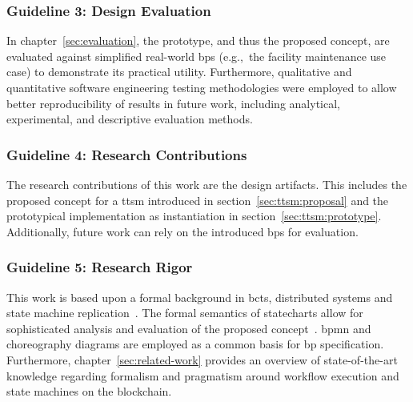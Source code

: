 \subsubsection{Guideline 3: Design Evaluation}
\label{sec:ttsm:methodology:gl3}
In chapter~\ref{sec:evaluation}, the prototype, and thus the proposed concept, are evaluated against simplified real-world \glspl{bp} (e.g.,\ the facility maintenance use case) to demonstrate its practical utility. Furthermore, qualitative and quantitative software engineering testing methodologies were employed to allow better reproducibility of results in future work, including analytical, experimental, and descriptive evaluation methods.

\subsubsection{Guideline 4: Research Contributions}
\label{sec:ttsm:methodology:gl4}
The research contributions of this work are the design artifacts. This includes the proposed concept for a \gls{ttsm} introduced in section~\ref{sec:ttsm:proposal} and the prototypical implementation as instantiation in section~\ref{sec:ttsm:prototype}. Additionally, future work can rely on the introduced \glspl{bp} for evaluation.

\subsubsection{Guideline 5: Research Rigor}
\label{sec:ttsm:methodology:gl5}
This work is based upon a formal background in \glspl{bct}, distributed systems and state machine replication~\cite{consensus_comparison_2019,nakamoto2009,ethereum_yellow_paper,impossibility_result_1985}. The formal semantics of statecharts allow for sophisticated analysis and evaluation of the proposed concept~\cite{inter_organizational_bps_managed_by_blockchain}. \gls{bpmn} and choreography diagrams are employed as a common basis for \gls{bp} specification. Furthermore, chapter~\ref{sec:related-work} provides an overview of state-of-the-art knowledge regarding formalism and pragmatism around workflow execution and state machines on the blockchain.

